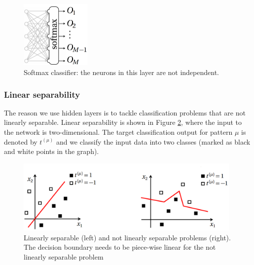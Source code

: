 \vspace{3mm}
\begin{figure}[htb]
	\begin{center}
		\includegraphics*[width=3.4cm, keepaspectratio]{obr/softmax.png}
	\end{center}
	\vspace{3mm}
	\caption{Softmax classifier: the neurons in this layer are
		not independent. \cite{mehlig}} 
	\label{softmax}
\end{figure}

\subsubsection{Linear separability}

The reason we use hidden layers is to tackle classification problems that are not linearly separable. Linear separability is shown in Figure \ref{separability}, where the input to the network is two-dimensional. The target classification output for pattern $ \mu $ is denoted by $ t^{(\mu)} $ and we classify the input data into two classes (marked as black and white points in the graph). \cite{mehlig}

\begin{figure}[htb]
	\begin{center}
		\includegraphics*[width=11cm, keepaspectratio]{obr/separability.png}
	\end{center}
	\vspace{3mm}
	\caption{Linearly separable (left) and not linearly separable problems (right). The decision boundary needs to be piece-wise linear for the not linearly separable problem \cite{mehlig}} 
	\label{separability}
\end{figure}

